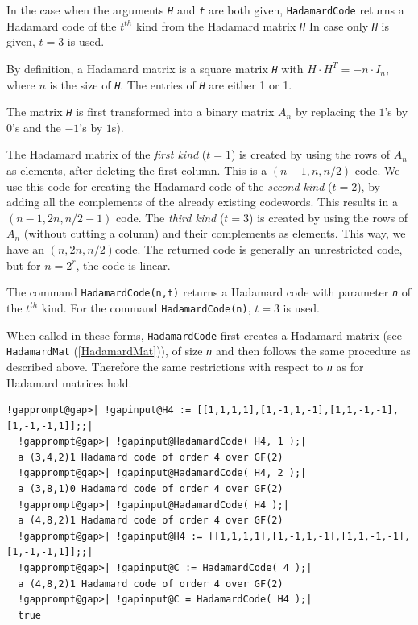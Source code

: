 \documentclass[a4paper,11pt]{report}
\begin{document}
{{{ In the case when the arguments \mbox{\texttt{\mdseries\slshape H}} and \mbox{\texttt{\mdseries\slshape t}} are both given, \texttt{HadamardCode} returns a Hadamard code of the $t^{th}$ kind from the Hadamard matrix \mbox{\texttt{\mdseries\slshape H}} In case only \mbox{\texttt{\mdseries\slshape H}} is given, $t = 3$ is used. 

 By definition, a Hadamard matrix is a square matrix \mbox{\texttt{\mdseries\slshape H}} with $H\cdot H^T = -n\cdot I_n$, where $n$ is the size of \mbox{\texttt{\mdseries\slshape H}}. The entries of \mbox{\texttt{\mdseries\slshape H}} are either 1 or \texttt{}1.  

 The matrix \mbox{\texttt{\mdseries\slshape H}} is first transformed into a binary matrix $A_n$ by replacing the $1$'s by $0$'s and the $-1$'s by $1$s). 

 The Hadamard matrix of the \emph{first kind} ($t=1$) is created by using the rows of $A_n$ as elements, after deleting the first column. This is a $(n-1, n, n/2)$ code. We use this code for creating the Hadamard code of the \emph{second kind} ($t=2$), by adding all the complements of the already existing codewords. This
results in a $(n-1, 2n, n/2 -1)$ code. The \emph{third kind} ($t=3$) is created by using the rows of $A_n$ (without cutting a column) and their complements as elements. This way, we
have an $(n, 2n, n/2)$\texttt{}code. The returned code is generally an unrestricted code,
but for $n = 2^r$, the code is linear. 

 The command \texttt{HadamardCode(n,t)} returns a Hadamard code with parameter \mbox{\texttt{\mdseries\slshape n}} of the $t^{th}$ kind. For the command \texttt{HadamardCode(n)}, $t=3$ is used. 

 When called in these forms, \texttt{HadamardCode} first creates a Hadamard matrix (see \texttt{HadamardMat} (\ref{HadamardMat})), of size \mbox{\texttt{\mdseries\slshape n}} and then follows the same procedure as described above. Therefore the same
restrictions with respect to \mbox{\texttt{\mdseries\slshape n}} as for Hadamard matrices hold. }

 
\begin{Verbatim}[commandchars=!@|,fontsize=\small,frame=single,label=Example]
  !gapprompt@gap>| !gapinput@H4 := [[1,1,1,1],[1,-1,1,-1],[1,1,-1,-1],[1,-1,-1,1]];;|
  !gapprompt@gap>| !gapinput@HadamardCode( H4, 1 );|
  a (3,4,2)1 Hadamard code of order 4 over GF(2)
  !gapprompt@gap>| !gapinput@HadamardCode( H4, 2 );|
  a (3,8,1)0 Hadamard code of order 4 over GF(2)
  !gapprompt@gap>| !gapinput@HadamardCode( H4 );|
  a (4,8,2)1 Hadamard code of order 4 over GF(2)
  !gapprompt@gap>| !gapinput@H4 := [[1,1,1,1],[1,-1,1,-1],[1,1,-1,-1],[1,-1,-1,1]];;|
  !gapprompt@gap>| !gapinput@C := HadamardCode( 4 );|
  a (4,8,2)1 Hadamard code of order 4 over GF(2)
  !gapprompt@gap>| !gapinput@C = HadamardCode( H4 );|
  true
\end{Verbatim}

}}
\end{document}
